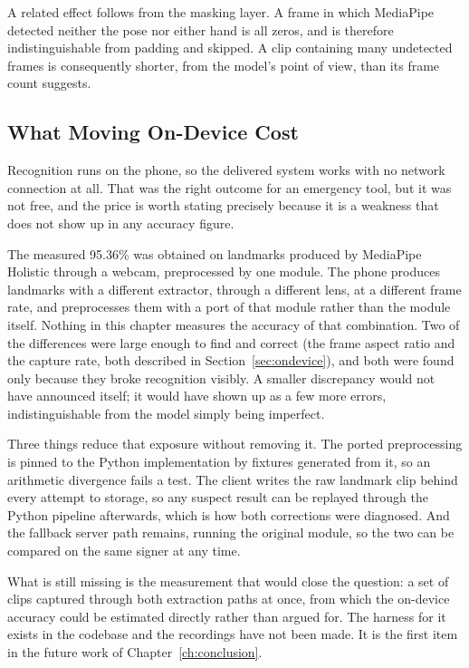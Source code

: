 A related effect follows from the masking layer. A frame in which MediaPipe detected neither the pose nor either hand is all zeros, and is therefore indistinguishable from padding and skipped. A clip containing many undetected frames is consequently shorter, from the model's point of view, than its frame count suggests.

\subsection{What Moving On-Device Cost}

Recognition runs on the phone, so the delivered system works with no network connection at all. That was the right outcome for an emergency tool, but it was not free, and the price is worth stating precisely because it is a weakness that does not show up in any accuracy figure.

The measured 95.36\% was obtained on landmarks produced by MediaPipe Holistic through a webcam, preprocessed by one module. The phone produces landmarks with a different extractor, through a different lens, at a different frame rate, and preprocesses them with a port of that module rather than the module itself. Nothing in this chapter measures the accuracy of that combination. Two of the differences were large enough to find and correct (the frame aspect ratio and the capture rate, both described in Section~\ref{sec:ondevice}), and both were found only because they broke recognition visibly. A smaller discrepancy would not have announced itself; it would have shown up as a few more errors, indistinguishable from the model simply being imperfect.

Three things reduce that exposure without removing it. The ported preprocessing is pinned to the Python implementation by fixtures generated from it, so an arithmetic divergence fails a test. The client writes the raw landmark clip behind every attempt to storage, so any suspect result can be replayed through the Python pipeline afterwards, which is how both corrections were diagnosed. And the fallback server path remains, running the original module, so the two can be compared on the same signer at any time.

What is still missing is the measurement that would close the question: a set of clips captured through both extraction paths at once, from which the on-device accuracy could be estimated directly rather than argued for. The harness for it exists in the codebase and the recordings have not been made. It is the first item in the future work of Chapter~\ref{ch:conclusion}.
